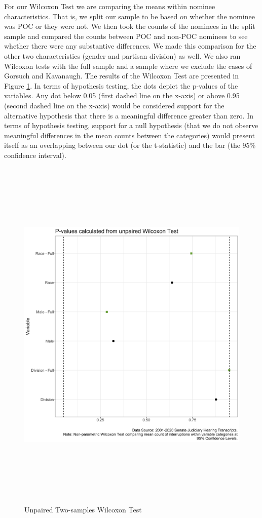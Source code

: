 \documentclass [12pt]{article}
\begin{document}
For our Wilcoxon Test we are comparing the means within nominee characteristics. That is, we split our sample to be based on whether the nominee was POC or they were not. We then took the counts of the nominees in the split sample and compared the counts between POC and non-POC nominees to see whether there were any substantive differences. We made this comparison for the other two characteristics (gender and partisan division) as well. We also ran Wilcoxon tests with the full sample and a sample where we exclude the cases of Gorsuch and Kavanaugh. The results of the Wilcoxon Test are presented in Figure \ref{fig:wilcox}. In terms of hypothesis testing, the dots depict the p-values of the variables. Any dot below 0.05 (first dashed line on the x-axis) or above 0.95 (second dashed line on the x-axis) would be considered support for the alternative hypothesis that there is a meaningful difference greater than zero. In terms of hypothesis testing, support for a null hypothesis (that we do not observe meaningful differences in the mean counts between the categories) would present itself as an overlapping between our dot (or the t-statistic) and the bar (the 95\% confidence interval). 
	   	    \begin{figure}[H]
	        \centering
	        \includegraphics[height = 175mm, width = 175mm]{../tables_figures/wilcox-test.png}
	        \caption{Unpaired Two-samples Wilcoxon Test}
	        \label{fig:wilcox}
	    \end{figure}
	    
\end{document}
